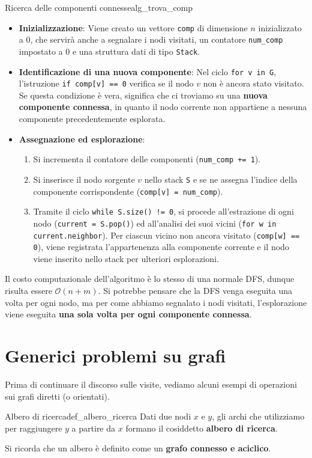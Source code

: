 \documentclass[12pt]{report}
\begin{document}
	\begin{algoritmo}{Ricerca delle componenti connesse}{alg_trova_comp}		
		\begin{itemize}
			\item \textbf{Inizializzazione}: Viene creato un vettore \texttt{comp} di dimensione $n$ inizializzato a $0$, che servirà anche a segnalare i nodi visitati, un contatore \texttt{num\_comp} impostato a $0$ e una struttura dati di tipo \texttt{Stack}.
			
			\item \textbf{Identificazione di una nuova componente}: Nel ciclo \texttt{for v in G}, l'istruzione \texttt{if comp[v] == 0} verifica se il nodo $v$ non è ancora stato visitato. Se questa condizione è vera, significa che ci troviamo su una \textbf{nuova componente connessa}, in quanto il nodo corrente non appartiene a nessuna componente precedentemente esplorata.
			
			\item \textbf{Assegnazione ed esplorazione}:
			\begin{enumerate}
				\item Si incrementa il contatore delle componenti (\texttt{num\_comp += 1}).
				\item Si inserisce il nodo sorgente $v$ nello stack \texttt{S} e se ne assegna l'indice della componente corrispondente (\texttt{comp[v] = num\_comp}).
				\item Tramite il ciclo \texttt{while S.size() != 0}, si procede all'estrazione di ogni nodo (\texttt{current = S.pop()}) ed all'analisi dei suoi vicini (\texttt{for w in current.neighbor}). Per ciascun vicino non ancora visitato (\texttt{comp[w] == 0}), viene registrata l'appartenenza alla componente corrente e il nodo viene inserito nello stack per ulteriori esplorazioni.
			\end{enumerate}
		\end{itemize}
		
	\end{algoritmo}
	
	Il costo computazionale dell'algoritmo è lo stesso di una normale DFS, dunque risulta essere $\mathcal{O}(n+m)$. Si potrebbe pensare che la DFS venga eseguita una volta per ogni nodo, ma per come abbiamo segnalato i nodi visitati, l'esplorazione viene eseguita \textbf{una sola volta per ogni componente connessa}.
	
	\section{Generici problemi su grafi}
	Prima di continuare il discorso sulle visite, vediamo alcuni esempi di operazioni sui grafi diretti (o orientati).
	\begin{definizione}{Albero di ricerca}{def_albero_ricerca}
		Dati due nodi $x$ e $y$, gli archi che utilizziamo per raggiungere $y$ a partire da $x$ formano il cosiddetto \textbf{albero di ricerca}. 
		
		Si ricorda che un albero è definito come un \textbf{grafo connesso e aciclico}.
	\end{definizione}
	
\end{document}
